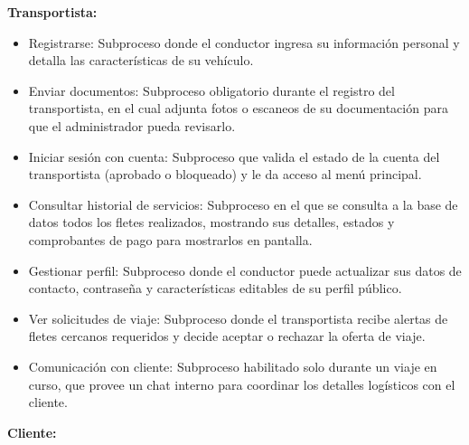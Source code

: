 \noindent \textbf{Transportista:}

\begin{itemize}
	\item Registrarse: Subproceso donde el conductor ingresa su información personal y detalla las características de su vehículo.
	\item Enviar documentos: Subproceso obligatorio durante el registro del transportista, en el cual adjunta fotos o escaneos de su documentación para que el administrador pueda revisarlo.
	\item Iniciar sesión con cuenta: Subproceso que valida el estado de la cuenta del transportista (aprobado o bloqueado) y le da acceso al menú principal.
	\item Consultar historial de servicios: Subproceso en el que se consulta a la base de datos todos los fletes realizados, mostrando sus detalles, estados y comprobantes de pago para mostrarlos en pantalla.
	\item Gestionar perfil: Subproceso donde el conductor puede actualizar sus datos de contacto, contraseña y características editables de su perfil público.
	\item Ver solicitudes de viaje: Subproceso donde el transportista recibe alertas de fletes cercanos requeridos y decide aceptar o rechazar la oferta de viaje.
	\item Comunicación con cliente: Subproceso habilitado solo durante un viaje en curso, que provee un chat interno para coordinar los detalles logísticos con el cliente.
	
\end{itemize}

\noindent \textbf{Cliente:}


